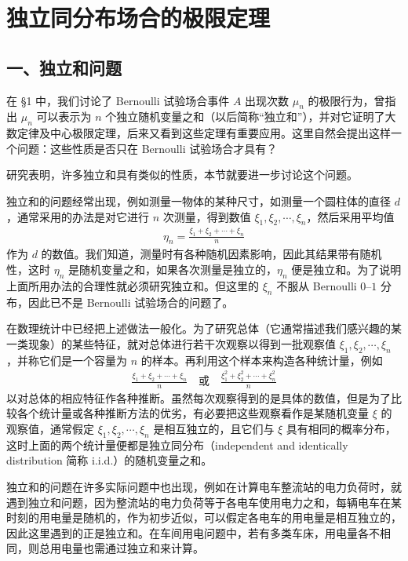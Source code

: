 \documentclass[../../main.tex]{subfiles}
\begin{document}
\section{独立同分布场合的极限定理}\label{section:ch05-独立同分布极限定理}

\subsection*{一、独立和问题}

在 \S1 中，我们讨论了 Bernoulli 试验场合事件 $A$ 出现次数 $\mu_n$ 的极限行为，曾指出 $\mu_n$ 可以表示为 $n$ 个独立随机变量之和（以后简称``独立和''），并对它证明了大数定律及中心极限定理，后来又看到这些定理有重要应用。这里自然会提出这样一个问题：这些性质是否只在 Bernoulli 试验场合才具有？

研究表明，许多独立和具有类似的性质，本节就要进一步讨论这个问题。

独立和的问题经常出现，例如测量一物体的某种尺寸，如测量一个圆柱体的直径 $d$，通常采用的办法是对它进行 $n$ 次测量，得到数值 $\xi_1,\xi_2,\cdots,\xi_n$，然后采用平均值
\begin{align*}
\eta_n=\frac{\xi_1+\xi_2+\cdots+\xi_n}{n}
\end{align*}
作为 $d$ 的数值。我们知道，测量时有各种随机因素影响，因此其结果带有随机性，这时 $\eta_n$ 是随机变量之和，如果各次测量是独立的，$\eta_n$ 便是独立和。为了说明上面所用办法的合理性就必须研究独立和。但这里的 $\xi_n$ 不服从 Bernoulli $0$--$1$ 分布，因此已不是 Bernoulli 试验场合的问题了。

在数理统计中已经把上述做法一般化。为了研究总体（它通常描述我们感兴趣的某一类现象）的某些特征，就对总体进行若干次观察以得到一批观察值 $\xi_1,\xi_2,\cdots,\xi_n$，并称它们是一个容量为 $n$ 的样本。再利用这个样本来构造各种统计量，例如
\begin{align*}
\frac{\xi_1+\xi_2+\cdots+\xi_n}{n}\quad\text{或}\quad \frac{\xi_1^{2}+\xi_2^{2}+\cdots+\xi_n^{2}}{n}
\end{align*}
以对总体的相应特征作各种推断。虽然每次观察得到的是具体的数值，但是为了比较各个统计量或各种推断方法的优劣，有必要把这些观察看作是某随机变量 $\xi$ 的观察值，通常假定 $\xi_1,\xi_2,\cdots,\xi_n$ 是相互独立的，且它们与 $\xi$ 具有相同的概率分布，这时上面的两个统计量便都是独立同分布（independent and identically distribution 简称 i.i.d.）的随机变量之和。

独立和的问题在许多实际问题中也出现，例如在计算电车整流站的电力负荷时，就遇到独立和问题，因为整流站的电力负荷等于各电车使用电力之和，每辆电车在某时刻的用电量是随机的，作为初步近似，可以假定各电车的用电量是相互独立的，因此这里遇到的正是独立和。在车间用电问题中，若有多类车床，用电量各不相同，则总用电量也需通过独立和来计算。
\end{document}
